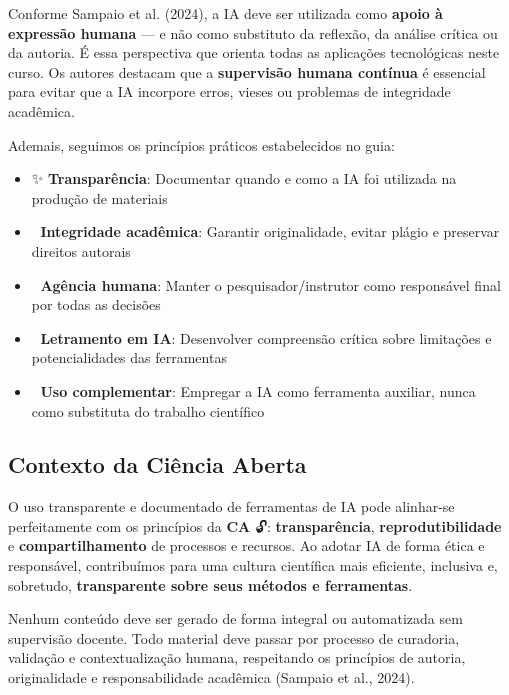\documentclass[
  a4paper,
]{book}
\providecommand{\tightlist}{%
  \setlength{\itemsep}{0pt}\setlength{\parskip}{0pt}}\usepackage{longtable,booktabs,array}
\newcommand{\emojitext}[1]{{\emoji #1}}
\begin{document}
Conforme Sampaio et al. (2024), a IA deve ser utilizada como
\textbf{apoio à expressão humana} --- e não como substituto da reflexão,
da análise crítica ou da autoria. É essa perspectiva que orienta todas
as aplicações tecnológicas neste curso. Os autores destacam que a
\textbf{supervisão humana contínua} é essencial para evitar que a IA
incorpore erros, vieses ou problemas de integridade acadêmica.

Ademais, seguimos os princípios práticos estabelecidos no guia:

\begin{itemize}
\tightlist
\item
  \emojitext{✨} \textbf{Transparência}: Documentar quando e como a IA
  foi utilizada na produção de materiais
\item
  \emojitext{🎯} \textbf{Integridade acadêmica}: Garantir originalidade,
  evitar plágio e preservar direitos autorais
\item
  \emojitext{👤} \textbf{Agência humana}: Manter o pesquisador/instrutor
  como responsável final por todas as decisões
\item
  \emojitext{🧠} \textbf{Letramento em IA}: Desenvolver compreensão
  crítica sobre limitações e potencialidades das ferramentas
\item
  \emojitext{🔄} \textbf{Uso complementar}: Empregar a IA como
  ferramenta auxiliar, nunca como substituta do trabalho científico
\end{itemize}

\subsection{Contexto da Ciência
Aberta}\label{contexto-da-ciuxeancia-aberta}

O uso transparente e documentado de ferramentas de IA pode alinhar-se
perfeitamente com os princípios da \textbf{CA} \emojitext{🔓}:
\textbf{transparência}, \textbf{reprodutibilidade} e
\textbf{compartilhamento} de processos e recursos. Ao adotar IA de forma
ética e responsável, contribuímos para uma cultura científica mais
eficiente, inclusiva e, sobretudo, \textbf{transparente sobre seus
métodos e ferramentas}.

Nenhum conteúdo deve ser gerado de forma integral ou automatizada sem
supervisão docente. Todo material deve passar por processo de curadoria,
validação e contextualização humana, respeitando os princípios de
autoria, originalidade e responsabilidade acadêmica (Sampaio et al.,
2024).
\end{document}
